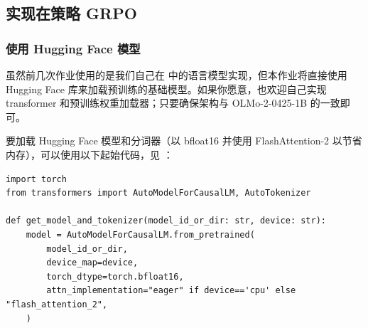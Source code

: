 \subsection{实现在策略 GRPO}

\subsubsection{使用 Hugging Face 模型}

虽然前几次作业使用的是我们自己在  中的语言模型实现，但本作业将直接使用 Hugging Face  库来加载预训练的基础模型。如果你愿意，也欢迎自己实现 transformer 和预训练权重加载器；只要确保架构与 OLMo-2-0425-1B 的一致即可。

要加载 Hugging Face 模型和分词器（以 bfloat16 并使用 FlashAttention-2 以节省内存），可以使用以下起始代码，见 ：

\begin{lstlisting}
import torch
from transformers import AutoModelForCausalLM, AutoTokenizer

def get_model_and_tokenizer(model_id_or_dir: str, device: str):
    model = AutoModelForCausalLM.from_pretrained(
        model_id_or_dir,
        device_map=device,
        torch_dtype=torch.bfloat16,
        attn_implementation="eager" if device=='cpu' else "flash_attention_2",
    )
\end{lstlisting}

